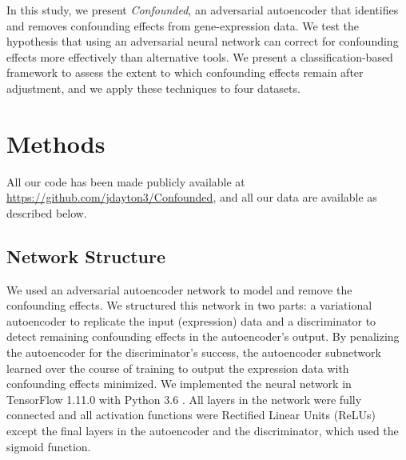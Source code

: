 \documentclass[11pt]{article}
\begin{document}
In this study, we present \textit{Confounded}, an adversarial autoencoder that identifies and removes confounding effects from gene-expression data.
We test the hypothesis that using an adversarial neural network can correct for confounding effects more effectively than alternative tools.
We present a classification-based framework to assess the extent to which confounding effects remain after adjustment, and we apply these techniques to four datasets.

\section{Methods} \label{sec:methods}

All our code has been made publicly available at \url{https://github.com/jdayton3/Confounded}, and all our data are available as described below.

\subsection{Network Structure}

We used an adversarial autoencoder network to model and remove the confounding effects.
We structured this network in two parts: a variational autoencoder \cite{louizos_variational_2015} to replicate the input (expression) data and a discriminator to detect remaining confounding effects in the autoencoder's output.
By penalizing the autoencoder for the discriminator's success, the autoencoder subnetwork learned over the course of training to output the expression data with confounding effects minimized.
We implemented the neural network in TensorFlow 1.11.0 \cite{abadi_tensorflow_2015} with Python 3.6 \cite{python_software_foundation_python_2019}.
All layers in the network were fully connected and all activation functions were Rectified Linear Units (ReLUs) \cite{agarap_deep_2018} except the final layers in the autoencoder and the discriminator, which used the sigmoid function.
\end{document}
